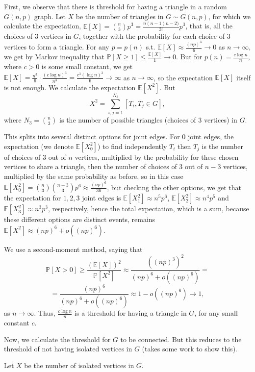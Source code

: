 \documentclass{article}
\begin{document}
First, we observe that there is threshold for having a triangle in a random $G(n,p)$ graph. Let $X$ be the number of triangles in $G\sim{G(n,p)}$, for which we calculate the expectation, $\mathbb{E}[X]=\binom{n}{3}p^3=\frac{n(n-1)n-2)}{3!}p^3$, that is, all the choices of $3$ vertices in $G$, together with the probability for each choice of $3$ vertices to form a triangle. For any $p=p(n)$ s.t. $\mathbb{E}[X]\approx\frac{(np)^3}{6}\rightarrow{0}$ as $n\rightarrow\infty$, we get by Markov inequality that $\mathbb{P}[X\geq{1}]\leq\frac{\mathbb{E}[X]}{1}\rightarrow{0}$. But for $p(n)=\frac{c\log{n}}{n}$, where $c>0$ is some small constant, we get $\mathbb{E}[X]=\frac{n^3}{6}\cdot\frac{(c\log{n})^3}{n^3}=\frac{c^3(\log{n})^3}{6}\rightarrow\infty$ as $n\rightarrow\infty$, so the expectation $\mathbb{E}[X]$ itself is not enough. We calculate the expectation $\mathbb{E}[X^2]$. But 
\[X^2=\sum_{i,j=1}^{N_3}[T_i,T_j\in{G}],\]
where $N_3=\binom{n}{3}$ is the number of possible triangles (choices of $3$ vertices) in $G$.

This splits into several distinct options for joint edges. For $0$ joint edges, the expectation (we denote $\mathbb{E}[X_0^2]$) to find independently $T_i$ then $T_j$ is the number of choices of $3$ out of $n$ vertices, multiplied by the probability for these chosen vertices to share a triangle, then the number of choices of $3$ out of $n-3$ vertices, multiplied by the same probability as before, so in this case $\mathbb{E}[X_0^2]=\binom{n}{3}\binom{n-3}{3}p^6\approx\frac{(np)^6}{36}$, but checking the other options, we get that the expectation for $1,2,3$ joint edges is $\mathbb{E}[X_1^2]\approx{n^5p^6}$, $\mathbb{E}[X_2^2]\approx{n^4p^5}$ and $\mathbb{E}[X_3^2]\approx{n^3p^3}$, respectively, hence the total expectation, which is a sum, because these different options are distinct events, remains $\mathbb{E}[X^2]\approx(np)^6+o((np)^6)$.

We use a second-moment method, saying that \[\mathbb{P}[X>0]\geq\frac{(\mathbb{E}[X])^2}{\mathbb{P}[X^2]}\approx\frac{((np)^3)^2}{(np)^6+o((np)^6)}=\]\[=\frac{(np)^6}{(np)^6+o((np)^6)}\approx{1-o((np)^6)}\rightarrow{1},\]
as $n\rightarrow\infty$.
Thus, $\frac{c\log{n}}{n}$ is a threshold for having a triangle in $G$, for any small constant $c$.

Now, we calculate the threshold for $G$ to be connected. But this reduces to the threshold of not having isolated vertices in $G$ (takes some work to show this).

Let $X$ be the number of isolated vertices in $G$. 
\end{document}
